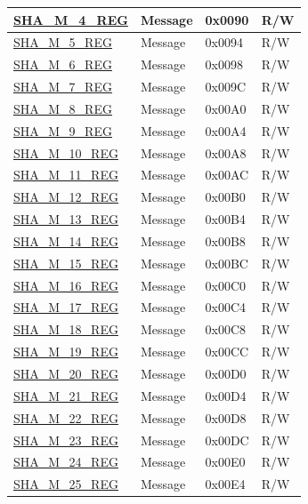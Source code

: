 \begin{longtable}{ | l | l | l |l | }
\hyperref[regdesc:SHAMNREG]{SHA\_M\_4\_REG} & Message & 0x0090 & R/W \\ \hline
\hyperref[regdesc:SHAMNREG]{SHA\_M\_5\_REG} & Message & 0x0094 & R/W \\ \hline
\hyperref[regdesc:SHAMNREG]{SHA\_M\_6\_REG} & Message & 0x0098 & R/W \\ \hline
\hyperref[regdesc:SHAMNREG]{SHA\_M\_7\_REG} & Message & 0x009C & R/W \\ \hline
\hyperref[regdesc:SHAMNREG]{SHA\_M\_8\_REG} & Message & 0x00A0 & R/W \\ \hline
\hyperref[regdesc:SHAMNREG]{SHA\_M\_9\_REG} & Message & 0x00A4 & R/W \\ \hline
\hyperref[regdesc:SHAMNREG]{SHA\_M\_10\_REG} & Message & 0x00A8 & R/W \\ \hline
\hyperref[regdesc:SHAMNREG]{SHA\_M\_11\_REG} & Message & 0x00AC & R/W \\ \hline
\hyperref[regdesc:SHAMNREG]{SHA\_M\_12\_REG} & Message & 0x00B0 & R/W \\ \hline
\hyperref[regdesc:SHAMNREG]{SHA\_M\_13\_REG} & Message & 0x00B4 & R/W \\ \hline
\hyperref[regdesc:SHAMNREG]{SHA\_M\_14\_REG} & Message & 0x00B8 & R/W \\ \hline
\hyperref[regdesc:SHAMNREG]{SHA\_M\_15\_REG} & Message & 0x00BC & R/W \\ \hline
\hyperref[regdesc:SHAMNREG]{SHA\_M\_16\_REG} & Message & 0x00C0 & R/W \\ \hline
\hyperref[regdesc:SHAMNREG]{SHA\_M\_17\_REG} & Message & 0x00C4 & R/W \\ \hline
\hyperref[regdesc:SHAMNREG]{SHA\_M\_18\_REG} & Message & 0x00C8 & R/W \\ \hline
\hyperref[regdesc:SHAMNREG]{SHA\_M\_19\_REG} & Message & 0x00CC & R/W \\ \hline
\hyperref[regdesc:SHAMNREG]{SHA\_M\_20\_REG} & Message & 0x00D0 & R/W \\ \hline
\hyperref[regdesc:SHAMNREG]{SHA\_M\_21\_REG} & Message & 0x00D4 & R/W \\ \hline
\hyperref[regdesc:SHAMNREG]{SHA\_M\_22\_REG} & Message & 0x00D8 & R/W \\ \hline
\hyperref[regdesc:SHAMNREG]{SHA\_M\_23\_REG} & Message & 0x00DC & R/W \\ \hline
\hyperref[regdesc:SHAMNREG]{SHA\_M\_24\_REG} & Message & 0x00E0 & R/W \\ \hline
\hyperref[regdesc:SHAMNREG]{SHA\_M\_25\_REG} & Message & 0x00E4 & R/W \\ \hline

\end{longtable}
